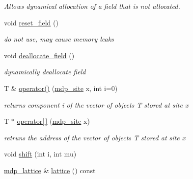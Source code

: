 \begin{CompactItemize}
\begin{CompactList}\small\item\em Allows dynamical allocation of a field that is not allocated. \item\end{CompactList}\item 
\hypertarget{classmdp__field_a581ac8278d31ed9dabbff2df49c7130}{
void \hyperlink{classmdp__field_a581ac8278d31ed9dabbff2df49c7130}{reset\_\-field} ()}
\label{classmdp__field_a581ac8278d31ed9dabbff2df49c7130}

\begin{CompactList}\small\item\em do not use, may cause memory leaks \item\end{CompactList}\item 
\hypertarget{classmdp__field_b063254fe74b88b1c9cc9e0cbc843b4b}{
void \hyperlink{classmdp__field_b063254fe74b88b1c9cc9e0cbc843b4b}{deallocate\_\-field} ()}
\label{classmdp__field_b063254fe74b88b1c9cc9e0cbc843b4b}

\begin{CompactList}\small\item\em dynamically deallocate field \item\end{CompactList}\item 
\hypertarget{classmdp__field_9eec94ee723253a196ccc4677832b4a0}{
T \& \hyperlink{classmdp__field_9eec94ee723253a196ccc4677832b4a0}{operator()} (\hyperlink{classmdp__site}{mdp\_\-site} x, int i=0)}
\label{classmdp__field_9eec94ee723253a196ccc4677832b4a0}

\begin{CompactList}\small\item\em returns component i of the vector of objects T stored at site x \item\end{CompactList}\item 
\hypertarget{classmdp__field_7dab126ffc90476401048cdf747077ef}{
T $\ast$ \hyperlink{classmdp__field_7dab126ffc90476401048cdf747077ef}{operator\mbox{[}$\,$\mbox{]}} (\hyperlink{classmdp__site}{mdp\_\-site} x)}
\label{classmdp__field_7dab126ffc90476401048cdf747077ef}

\begin{CompactList}\small\item\em retruns the address of the vector of objects T stored at site x \item\end{CompactList}\item 
void \hyperlink{classmdp__field_8ff0ae3336b70be5c58299322662275e}{shift} (int i, int mu)
\item 
\hypertarget{classmdp__field_31b1149be220cdeeb72281163579f3bc}{
\hyperlink{classmdp__lattice}{mdp\_\-lattice} \& \hyperlink{classmdp__field_31b1149be220cdeeb72281163579f3bc}{lattice} () const }
\label{classmdp__field_31b1149be220cdeeb72281163579f3bc}


\end{CompactItemize}
